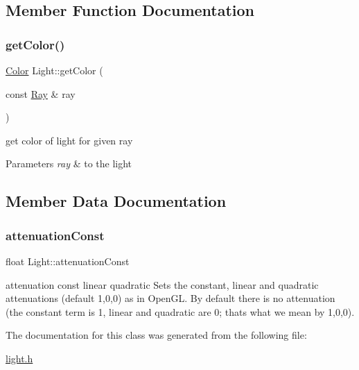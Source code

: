 \subsection{Member Function Documentation}
\mbox{\label{class_light_a0fb5b95b28c59924030681c0d2646e87}} 
\subsubsection{\texorpdfstring{get\+Color()}{getColor()}}
{\footnotesize\ttfamily \mbox{\hyperlink{class_color}{Color}} Light\+::get\+Color (\begin{DoxyParamCaption}\item[{const \mbox{\hyperlink{class_ray}{Ray}} \&}]{ray }\end{DoxyParamCaption})\hspace{0.3cm}{\ttfamily [inline]}}

get color of light for given ray 
\begin{DoxyParams}{Parameters}
{\em ray} & to the light \\
\hline
\end{DoxyParams}


\subsection{Member Data Documentation}
\mbox{\label{class_light_a27af00db907fd279ba3e342d6c5ec8c2}} 
\subsubsection{\texorpdfstring{attenuation\+Const}{attenuationConst}}
{\footnotesize\ttfamily float Light\+::attenuation\+Const}

attenuation const linear quadratic Sets the constant, linear and quadratic attenuations (default 1,0,0) as in Open\+GL. By default there is no attenuation (the constant term is 1, linear and quadratic are 0; that\textquotesingle{}s what we mean by 1,0,0). 

The documentation for this class was generated from the following file\+:\begin{DoxyCompactItemize}
\item 
\mbox{\hyperlink{light_8h}{light.\+h}}\end{DoxyCompactItemize}
